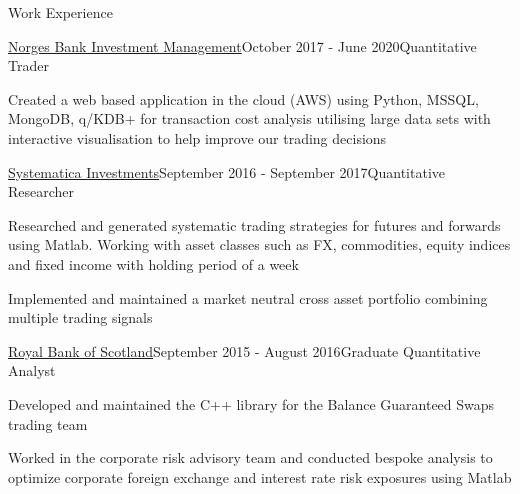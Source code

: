 \documentclass{resume} %
\begin{document}
\begin{rSection}{Work Experience}
\begin{rSubsection}{\href{https://www.nbim.no/}{Norges Bank Investment Management}}{October 2017 - June 2020}{Quantitative Trader}{}
	\item Created a web based application in the cloud (AWS) using Python, MSSQL, MongoDB, q/KDB+ for transaction cost analysis utilising large data sets with interactive visualisation to help improve our trading decisions
	\fi
\end{rSubsection}
\begin{rSubsection}{\href{https://www.systematica.com/}{Systematica Investments}}{September 2016 - September 2017}{Quantitative Researcher}{}
	\item Researched and generated systematic trading strategies for futures and forwards using Matlab. Working with asset classes such as FX, commodities, equity indices and fixed income with holding period of a week
	\item Implemented and maintained a market neutral cross asset portfolio combining multiple trading signals
	\iffalse
	\item Maintained and expanded the code base to ensure the current trading systems are functional and efficient
	\item Presented relevant academic research and collaborating with colleagues on current models
	\item Procured macro data from a variety of sources to explore a diverse range of trading signals
	\item Conducted teaching sessions on Excel and VBA for colleagues. Contributing to the graduate recruitment by presenting at university events
	\fi
\end{rSubsection}
\begin{rSubsection}{\href{https://www.natwestmarkets.com/}{Royal Bank of Scotland}}{September 2015 - August 2016}{Graduate Quantitative Analyst}{}
	\item Developed and maintained the C++ library for the Balance Guaranteed Swaps trading team
	\item Worked in the corporate risk advisory team and conducted bespoke analysis to optimize corporate foreign exchange and interest rate risk exposures using Matlab
	\iffalse
	\item Developed and backtested signalling models for foreign exchange risk exposure hedging within Matlab
	\item Lead the development for an innovative and flexible trading platform to obtain fixed interest rates for many types of loans
	\item Built an optimization tool within Matlab for client swap portfolios to optimize their CVA, FVA and capital charges 
	\item Created a correlation tool using VBA and Matlab with multiple parameters to allow full flexibility for the user which analyses historical correlation over time
	\fi


\end{rSubsection}
\end{rSection}
\end{document}
